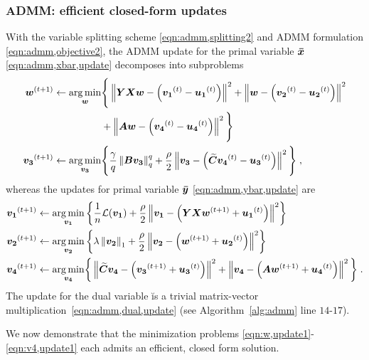 \subsubsection{ADMM: efficient closed-form updates}
\label{subsec:admm,steps}

With the variable splitting scheme \eqref{eqn:admm,splitting2} and ADMM formulation \eqref{eqn:admm,objective2}, the ADMM update for the primal variable ${\bm{\bar{x}}}$ \eqref{eqn:admm,xbar,update} decomposes into subproblems
\begin{alignat}{1} 
	{\ensuremath{\bm{w}}}^{(t+1)} 	\leftarrow \operatorname*{arg\,min}_{{\bm{w}}}&
		 \Bigg\{\left\| {\bm{Y}}{\bm{X}}{\bm{w}}-\left({\bm{v_1}}^{(t)}-{\bm{u_1}}^{(t)}\right) \right\|^2 
		+ \left\| {\bm{w}}-\left({\bm{v_2}}^{(t)}-{\bm{u_2}}^{(t)}\right) \right\|^2 \nonumber \\
		  &+ \left\| {\bm{A}}{\bm{w}}-\left({\bm{v_4}}^{(t)}-{\bm{u_4}}^{(t)}\right) \right\|^2 \Bigg\} \label{eqn:w,update1} \\
	{\bm{v_3}}^{(t+1)} \leftarrow \operatorname*{arg\,min}_{{\bm{v_3}}}&
		\Bigg\{\frac{\gamma}{q}\left\| {\bm{B}}{\bm{v_3}} \right\|_q^q
		  +\frac{\rho}{2}\left\| {\bm{v_3}}-\left({\bm{\widetilde{C}}}{\bm{v_4}}^{(t)}-{\bm{u_3}}^{(t)}\right) \right\|^2\Bigg\}\;, \label{eqn:v3,update1}
\end{alignat}
whereas the updates for primal variable ${\bm{\bar{y}}}$ \eqref{eqn:admm,ybar,update} are
\begin{alignat}{1} 
	{\ensuremath{\bm{v_1}}}^{(t+1)} \leftarrow \operatorname*{arg\,min}_{{\bm{v_1}}}
		& \left\{ \frac{1}{n}\mathcal{L}({\bm{v_1}}) + \frac{\rho}{2}\left\| {\bm{v_1}}-\left({\bm{Y}}{\bm{X}}{\bm{w}}^{(t+1)}+{\bm{u_1}}^{(t)}\right) \right\|^2 \right\}
			\label{eqn:v1,update1}\\
	{\bm{v_2}}^{(t+1)} \leftarrow \operatorname*{arg\,min}_{{\bm{v_2}}} 
		& \left\{\lambda\left\| {\bm{v_2}} \right\|_1 + \frac{\rho}{2}\left\|    {\bm{v_2}}-\left({\bm{w}}^{(t+1)}+{\bm{u_2}}^{(t)}\right) \right\|^2 
			\label{eqn:v2,update1}\right\}\\
	{\bm{v_4}}^{(t+1)} \leftarrow \operatorname*{arg\,min}_{{\bm{v_4}}}
		& \bigg\{\left\| {\bm{\widetilde{C}}}{\bm{v_4}}-\left({\bm{v_3}}^{(t+1)}+{\bm{u_3}}^{(t)}\right) \right\|^2
		 + \left\| {\bm{v_4}}-\left({\bm{A}}{\bm{w}}^{(t+1)}+{\bm{u_4}}^{(t)}\right) \right\|^2\bigg\} \;.  \label{eqn:v4,update1}
\end{alignat}
The update for the dual variable \u is a trivial matrix-vector \mbox{multiplication \eqref{eqn:admm,dual,update}} (see Algorithm~\ref{alg:admm} line $14$-$17$).

We now demonstrate that the minimization problems \eqref{eqn:w,update1}-\eqref{eqn:v4,update1} each admits an efficient, closed form solution.

\newcommand{\Bvarrho}{\bmath{\varrho}}

